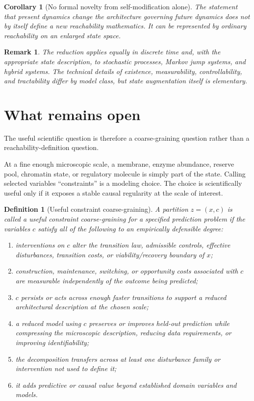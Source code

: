 \documentclass[11pt]{article}
\newtheorem{corollary}{Corollary}
\newtheorem{remark}{Remark}
\newtheorem{definition}{Definition}
\begin{document}
\begin{corollary}[No formal novelty from self-modification alone]
The statement that present dynamics change the architecture governing future dynamics does not by itself define a new reachability mathematics. It can be represented by ordinary reachability on an enlarged state space.
\end{corollary}

\begin{remark}
The reduction applies equally in discrete time and, with the appropriate state description, to stochastic processes, Markov jump systems, and hybrid systems. The technical details of existence, measurability, controllability, and tractability differ by model class, but state augmentation itself is elementary.
\end{remark}

\section{What remains open}

The useful scientific question is therefore a coarse-graining question rather than a reachability-definition question.

At a fine enough microscopic scale, a membrane, enzyme abundance, reserve pool, chromatin state, or regulatory molecule is simply part of the state. Calling selected variables ``constraints'' is a modeling choice. The choice is scientifically useful only if it exposes a stable causal regularity at the scale of interest.

\begin{definition}[Useful constraint coarse-graining]
A partition $z=(x,c)$ is called a useful constraint coarse-graining for a specified prediction problem if the variables $c$ satisfy all of the following to an empirically defensible degree:
\begin{enumerate}
\item interventions on $c$ alter the transition law, admissible controls, effective disturbances, transition costs, or viability/recovery boundary of $x$;
\item construction, maintenance, switching, or opportunity costs associated with $c$ are measurable independently of the outcome being predicted;
\item $c$ persists or acts across enough faster transitions to support a reduced architectural description at the chosen scale;
\item a reduced model using $c$ preserves or improves held-out prediction while compressing the microscopic description, reducing data requirements, or improving identifiability;
\item the decomposition transfers across at least one disturbance family or intervention not used to define it;
\item it adds predictive or causal value beyond established domain variables and models.
\end{enumerate}
\end{definition}
\end{document}
